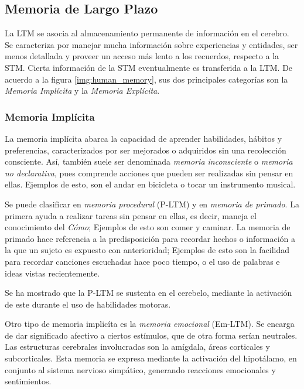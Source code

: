 \subsection{Memoria de Largo Plazo}

La LTM se asocia al almacenamiento permanente de informaci\'on en el cerebro. Se caracteriza por manejar mucha informaci\'on sobre experiencias y entidades, ser menos detallada y proveer un acceso m\'as lento a los recuerdos, respecto a la STM\cite{Eichenbaum:2008}. Cierta informaci\'on de la STM eventualmente es transferida a la LTM. De acuerdo a la figura \ref{img:human_memory}, sus dos principales categor\'ias son la \textit{Memoria Impl\'icita} y la \textit{Memoria Expl\'icita}.

\subsubsection{Memoria Impl\'icita}

La memoria impl\'icita  abarca la capacidad de aprender habilidades, h\'abitos y preferencias, caracterizados por ser mejorados o adquiridos sin una recolecci\'on consciente. As\'i, tambi\'en suele ser denominada \textit{memoria inconsciente} o \textit{memoria no declarativa}, pues comprende acciones que pueden ser realizadas sin pensar en ellas. Ejemplos de esto, son el andar en bicicleta o tocar un instrumento musical.

Se puede clasificar en \textit{memoria procedural} (P-LTM) y en \textit{memoria de primado}. La primera ayuda a realizar tareas sin pensar en ellas, es decir, maneja el conocimiento del \textit{C\'omo}; Ejemplos de esto son comer y caminar. La memoria de primado hace referencia a la predisposici\'on para recordar hechos o informaci\'on a la que un sujeto es expuesto con anterioridad; Ejemplos de esto son la facilidad para recordar canciones escuchadas hace poco tiempo, o el uso de palabras e ideas vistas recientemente.

Se ha mostrado que la P-LTM se sustenta en el cerebelo, mediante la activaci\'on de este durante el uso de habilidades motoras.

Otro tipo de memoria implic\'ita es la \textit{memoria emocional} (Em-LTM). Se encarga de dar significado afectivo a ciertos  est\'imulos, que de otra forma ser\'ian neutrales. Las estructuras cerebrales involucradas son la am\'igdala, \'areas corticales y subcorticales. Esta memoria se expresa mediante la activaci\'on del hipot\'alamo, en conjunto al sistema nervioso simp\'atico, generando reacciones emocionales y sentimientos.


